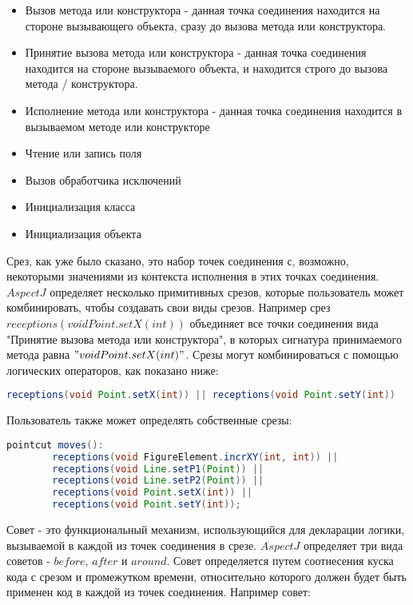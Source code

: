 \begin{itemize}
    \item Вызов метода или конструктора - данная точка соединения находится на стороне вызывающего объекта, сразу до вызова метода или конструктора.
    \item Принятие вызова метода или конструктора - данная точка соединения находится на стороне вызываемого объекта, и находится строго до вызова метода / конструктора.
    \item Исполнение метода или конструктора - данная точка соединения находится в вызываемом методе или конструкторе
    \item Чтение или запись поля
    \item Вызов обработчика исключений
    \item Инициализация класса
    \item Инициализация объекта
\end{itemize}

Срез, как уже было сказано, это набор точек соединения с, возможно, некоторыми значениями из контекста исполнения в этих точках соединения. $AspectJ$ определяет несколько примитивных срезов, которые пользователь может комбинировать, чтобы создавать свои виды срезов. Например срез $receptions(void Point.setX(int))$ объединяет все точки соединения вида "Принятие вызова метода или конструктора", в которых сигнатура принимаемого метода равна $"void Point.setX(int)"$. Срезы могут комбинироваться с помощью логических операторов, как показано ниже:

\begin{lstlisting}[language=Java, caption={Срез, следящий за координатой точки $x$ или $y$.}]
    receptions(void Point.setX(int)) || receptions(void Point.setY(int))
\end{lstlisting}

Пользователь также может определять собственные срезы:

\begin{lstlisting}[language=Java, caption={Пользовательский срез, следящий за координатой точки $x$ или $y$.}]
    pointcut moves():
        receptions(void FigureElement.incrXY(int, int)) ||
        receptions(void Line.setP1(Point)) ||
        receptions(void Line.setP2(Point)) ||
        receptions(void Point.setX(int)) ||
        receptions(void Point.setY(int));
\end{lstlisting}

Совет - это функциональный механизм, использующийся для декларации логики, вызываемой в каждой из точек соединения в срезе. $AspectJ$ определяет три вида советов - $before$, $after$ и $around$. Совет определяется путем соотнесения куска кода с срезом и промежутком времени, относительно которого должен будет быть применен код в каждой из точек соединения. Например совет:

